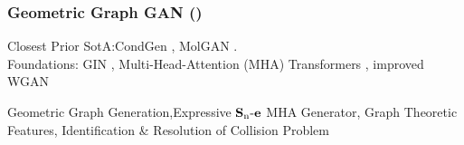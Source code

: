 \documentclass[./presentation.tex]{subfiles}
\begin{document}
\begin{frame}[t,label=gggfin]
  \frametitle{Geometric Graph GAN (\cite{krawczukGGGANGeometricGraph2020})}
  \vspace{-1cm}
  \small
  \begin{priorart}
  Closest Prior SotA:CondGen \citep{yangConditionalStructureGeneration2019e}, MolGAN \citep{decaoMolGANImplicitGenerative2022b}.\\
   Foundations: GIN \citep{xuHowPowerfulAre2019e}, Multi-Head-Attention (MHA) Transformers \citep{vaswaniAttentionAllYou2017c}, improved WGAN \citep{gulrajaniImprovedTrainingWasserstein2017d}
  \end{priorart}
  \begin{contributions}
    Geometric Graph Generation,Expressive $\operatorname{\mathbf{S}_n\mathbf{-e}}$ MHA Generator, Graph Theoretic Features, Identification \& Resolution of Collision Problem
  \end{contributions}
  \begin{columns}
  \end{columns}
  
\end{frame}
\end{document}
